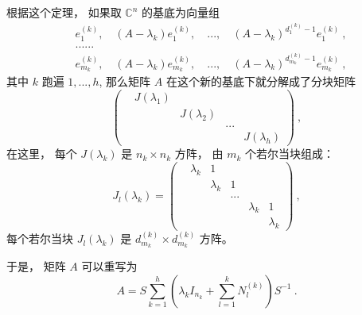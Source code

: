 根据这个定理， 如果取 $\mathbb{C}^n$ 的基底为向量组
$$
\begin{aligned}
&e^{(k)}_1,\quad(A-\lambda_k)e^{(k)}_1,\quad...,\quad(A-\lambda_k)^{d^{(k)}_1-1}e^{(k)}_1~,\\
&......\\
&e^{(k)}_{m_k},\quad(A-\lambda_k)e^{(k)}_{m_k},\quad...,\quad(A-\lambda_k)^{d^{(k)}_{m_k}-1}e^{(k)}_{m_k}~,
\end{aligned}
$$
其中 $k$ 跑遍 $1,...,h$, 那么矩阵 $A$ 在这个新的基底下就分解成了分块矩阵
$$
\left(
\begin{matrix}
&J(\lambda_1) &  & & \\
& &J(\lambda_2) & & \\
& & &...\\
& & & & J(\lambda_h)
\end{matrix}
\right)~,
$$
在这里， 每个 $J(\lambda_k)$ 是 $n_k\times n_k$ 方阵， 由 $m_k$ 个若尔当块组成：
$$
J_l(\lambda_k)
=\left(
\begin{matrix}
&\lambda_k & 1 & & & \\
& &\lambda_k & 1 & & \\
& & &...\\
& & & & \lambda_k & 1\\
& & & & & \lambda_k
\end{matrix}
\right)~,
$$
每个若尔当块 $J_l(\lambda_k)$ 是 $d_{m_k}^{(k)}\times d_{m_k}^{(k)}$ 方阵。

于是， 矩阵 $A$ 可以重写为
$$
A=S\sum_{k=1}^h\left(\lambda_kI_{n_k}+\sum_{l=1}^k N_l^{(k)}\right)S^{-1}~.
$$
